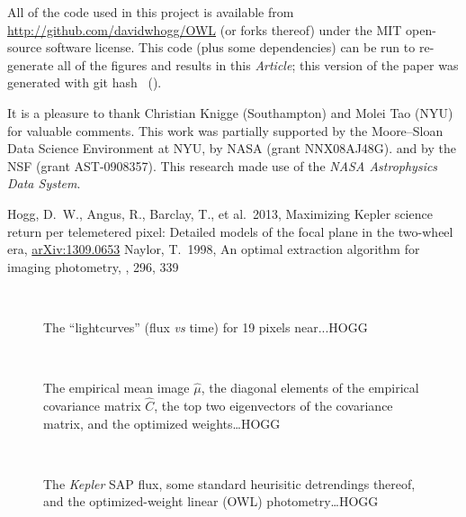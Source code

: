 \documentclass[12pt, letterpaper, preprint]{aastex}
\newcommand{\documentname}{\textsl{Article}}
\newcommand{\project}[1]{\textsl{#1}}
\newcommand{\foreign}[1]{\textsl{#1}}
\newcommand{\etal}{\foreign{et\,al.}}
\begin{document}
All of the code used in this project is available
  from \url{http://github.com/davidwhogg/OWL} (or forks thereof)
  under the MIT open-source software license.
This code (plus some dependencies) can be run
  to re-generate all of the figures and results in this \documentname;
  this version of the paper was generated with git hash \githash\ (\gitdate).

\acknowledgments
It is a pleasure to thank
  Christian Knigge (Southampton) and
  Molei Tao (NYU)
for valuable comments.
This work was partially supported by the Moore--Sloan Data Science Environment at NYU,
  by NASA (grant NNX08AJ48G).
  and by the NSF (grant AST-0908357).
This research made use of the \project{NASA Astrophysics Data System}.

\newcommand{\arxiv}[1]{\href{http://arxiv.org/abs/#1}{arXiv:#1}}
\begin{thebibliography}{}\raggedright
\bibitem[Hogg \etal(2013)]{hoggwhitepaper}
Hogg, D.~W., Angus, R., Barclay, T., et al.\ 2013,
Maximizing Kepler science return per telemetered pixel: Detailed models of the focal plane in the two-wheel era,
\arxiv{1309.0653}
Naylor, T.\ 1998,
An optimal extraction algorithm for imaging photometry,
\mnras, 296, 339
\end{thebibliography}

\clearpage

\begin{figure}
~
\caption{
The ``lightcurves'' (flux \foreign{vs} time) for 19 pixels near...HOGG
\label{fig:pixels}}
\end{figure}

\begin{figure}
~
\caption{
The empirical mean image $\hat{\mu}$,
  the diagonal elements of the empirical covariance matrix $\hat{C}$,
  the top two eigenvectors of the covariance matrix,
  and the optimized weights\ldots HOGG
\label{fig:images}}
\end{figure}

\begin{figure}
~
\caption{
The \project{Kepler} SAP flux,
  some standard heurisitic detrendings thereof,
  and the optimized-weight linear (OWL) photometry\ldots HOGG
\label{fig:results}}
\end{figure}
\end{document}
